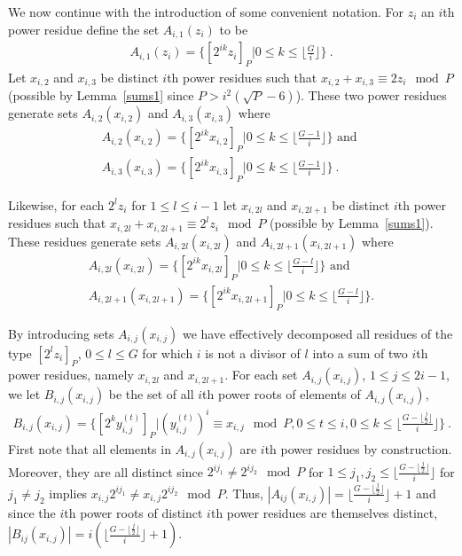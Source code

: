 We now continue with the introduction of some convenient notation.
For $z_i$ an $i$th power residue define the set $A_{i,1}(z_i)$ to
be
\begin{eqnarray}\label{azi1}A_{i,1}(z_i)=\{[2^{ik}z_i]_P | 0 \leq k \leq
\lfloor\frac{G}{i} \rfloor \}~.\end{eqnarray} Let $x_{i,2}$ and
$x_{i,3}$ be distinct $i$th power residues such that
$x_{i,2}+x_{i,3} \equiv 2z_i \mod P$ (possible by
Lemma~\ref{sums1} since $P>i^2(\sqrt{P}-6)$). These two power
residues generate sets $A_{i,2}(x_{i,2})$ and  $A_{i,3}(x_{i,3})$
where
\begin{eqnarray}\label{azi2} A_{i,2}(x_{i,2}) =\{ [2^{ik}x_{i,2}]_P| 0 \leq k \leq \lfloor
\frac{G-1}{i} \rfloor \} \text{ and }\\
\label{azi3}A_{i,3}(x_{i,3}) =\{ [2^{ik}x_{i,3}]_P| 0 \leq k \leq
\lfloor \frac{G-1}{i} \rfloor \}~.\end{eqnarray}

Likewise, for each $2^lz_i$ for $1 \leq l \leq i-1$ let $x_{i,2l}$
and $x_{i,2l+1}$ be distinct $i$th power residues such that
$x_{i,2l} + x_{i,2l+1} \equiv 2^lz_i \mod P$ (possible by
Lemma~\ref{sums1}). These residues generate sets
$A_{i,2l}(x_{i,2l})$ and  $A_{i,2l+1}(x_{i,2l+1})$ where
\begin{eqnarray}\label{azi2l}
A_{i,2l}(x_{i,2l}) =\{ [2^{ik}x_{i,2l}]_P| 0 \leq k \leq \lfloor
\frac{G-l}{i} \rfloor \} \text{ and }\\
\label{azi2la}A_{i,2l+1}(x_{i,2l+1}) =\{ [2^{ik}x_{i,2l+1}]_P| 0
\leq k \leq \lfloor \frac{G-l}{i} \rfloor \}.\end{eqnarray}

By introducing sets $A_{i,j}(x_{i,j})$ we have effectively
decomposed all residues of the type $[2^lz_i]_P$, $0 \leq l \leq
G$ for which $i$ is not a divisor of $l$ into a sum of two $i$th
power residues, namely $x_{i,2l}$ and $x_{i,2l+1}$. For each set
$A_{i,j}(x_{i,j})$, $1 \leq j \leq 2i-1$, we let
$B_{i,j}(x_{i,j})$ be the set of all $i$th power roots of elements
of $A_{i,j}(x_{i,j})$,
\begin{eqnarray}\label{bzi2l}
B_{i,j}(x_{i,j}) =\{ [2^{k}y_{i,j}^{(t)}]_P| (y_{i,j}^{(t)})^i
\equiv x_{i,j} \mod P, 0 \leq t \leq i, 0 \leq k \leq \lfloor
\frac{G-\lfloor \frac{j}{2} \rfloor}{i} \rfloor \}~.
\end{eqnarray}
First note that all elements in $A_{i,j}(x_{i,j})$ are $i$th power
residues by construction. Moreover, they are all distinct since
$2^{ij_1} \neq 2^{ij_2} \mod P$ for $1 \leq j_1,j_2 \leq \lfloor
\frac{G-\lfloor\frac{j}{2} \rfloor}{i} \rfloor$ for $j_1\neq j_2$
implies $x_{i,j}2^{ij_1} \neq x_{i,j}2^{ij_2} \mod P$. Thus,
$|A_{ij}(x_{i,j})|=\lfloor \frac{G-\lfloor \frac{j}{2}\rfloor}{i}
\rfloor+1$ and since the $i$th power roots of distinct $i$th power
residues are themselves distinct,
$|B_{ij}(x_{i,j})|=i\left(\lfloor \frac{G-\lfloor
\frac{j}{2}\rfloor}{i} \rfloor+1\right)$.



